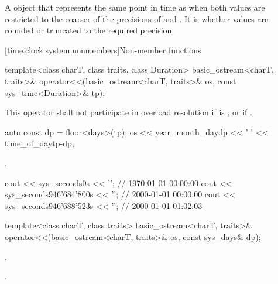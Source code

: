 \begin{itemdescr}
\pnum
\returns A  object that represents the same point in time as 
when both values are restricted to the coarser of the precisions of  and
.
It is 
whether values are rounded or truncated to the required precision.
\end{itemdescr}

[time.clock.system.nonmembers]{Non-member functions}

%
\begin{itemdecl}
template<class charT, class traits, class Duration>
  basic_ostream<charT, traits>&
    operator<<(basic_ostream<charT, traits>& os, const sys_time<Duration>& tp);
\end{itemdecl}

\begin{itemdescr}
\pnum
\remarks
This operator shall not participate in overload resolution if
 is ,
or if .

\pnum
\effects
\begin{codeblock}
auto const dp = floor<days>(tp);
os << year_month_day{dp} << ' ' << time_of_day{tp-dp};
\end{codeblock}

\pnum
\returns {}.

\pnum
\begin{example}
\begin{codeblock}
cout << sys_seconds{0s} << '\n';                // 1970-01-01 00:00:00
cout << sys_seconds{946'684'800s} << '\n';      // 2000-01-01 00:00:00
cout << sys_seconds{946'688'523s} << '\n';      // 2000-01-01 01:02:03
\end{codeblock}
\end{example}
\end{itemdescr}

%
\begin{itemdecl}
template<class charT, class traits>
  basic_ostream<charT, traits>&
    operator<<(basic_ostream<charT, traits>& os, const sys_days& dp);
\end{itemdecl}

\begin{itemdescr}
\pnum
\effects {}.

\pnum
\returns {}.
\end{itemdescr}

